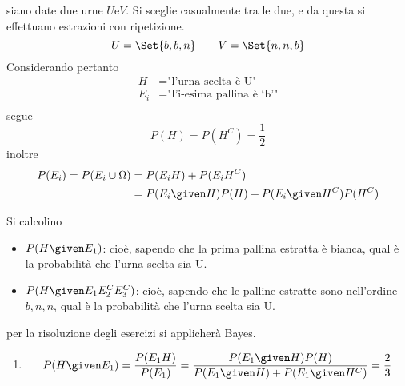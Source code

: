 \documentclass{subfiles}
\begin{document}
\begin{Exercise*}
    siano date due urne \(U \text{e} V\). Si sceglie casualmente tra le due, e da questa si effettuano estrazioni con ripetizione.
    \[
        U = \Set{b, b, n} \qquad V = \Set{n, n, b}
    \]
    Considerando pertanto
    \[\begin{aligned}
            H     & = \text{"l'urna scelta è U"}       \\
            E_{i} & = \text{"l'i-esima pallina è `b'"} \\
        \end{aligned}\]
    segue
    \[
        P(H) = P(H^{C}) = \frac{1}{2}
    \]
    inoltre
    \[\begin{aligned}
            P(E_{i}) = P(E_{i} \cup \Omega) & = P(E_{i} H) + P(E_{i} H^{C})                           \\
                                            & = P(E_{i} \given H)P(H) + P(E_{i} \given H^{C})P(H^{C})
        \end{aligned}\]

    Si calcolino
    \begin{itemize}
        \item \(P(H \given E_{1})\): cioè, sapendo che la prima pallina estratta è bianca, qual è la probabilità che l'urna scelta sia U.
        \item \(P(H \given E_{1}E_{2}^{C}E_{3}^{C})\): cioè, sapendo che le palline estratte sono nell'ordine \(b, n, n\), qual è la probabilità che l'urna scelta sia U.
    \end{itemize}

    \begin{Solution*}
        per la risoluzione degli esercizi si applicherà Bayes.
        \begin{enumerate}
            \item \[
                      P(H \given E_{1}) = \frac{P(E_{1}H)}{P(E_{1})} = \frac{P(E_{1} \given H)P(H)}{P(E_{1} \given H) + P(E_{1} \given H^{C})} = \frac{2}{3}
                  \]


\end{enumerate}
\end{Solution*}
\end{Exercise*}
\end{document}
